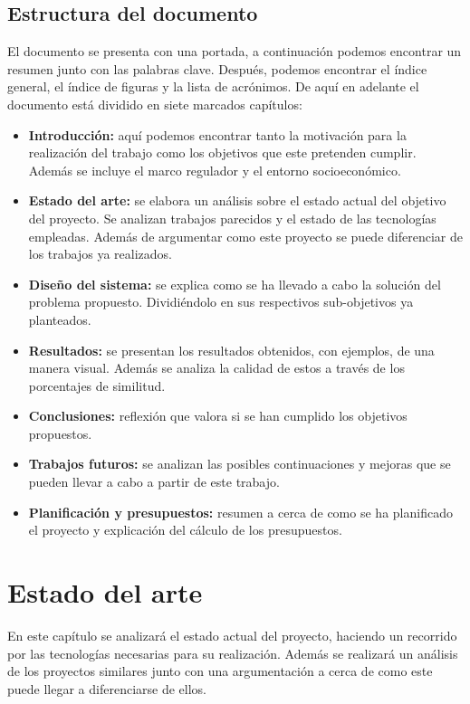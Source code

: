 \documentclass[12pt]{report} %
\begin{document}
	\section{Estructura del documento}
	El documento se presenta con una portada, a continuación podemos encontrar un resumen junto con las palabras clave. Después, podemos
	encontrar el índice general, el índice de figuras y la lista de acrónimos. De aquí en adelante el documento
	está dividido en siete marcados capítulos:
	\begin{itemize}
		\item \textbf{Introducción:} aquí podemos encontrar tanto la motivación para la realización del trabajo como los objetivos que este pretenden cumplir. Además se incluye el marco regulador y el entorno socioeconómico. 
		\item \textbf{Estado del arte:} se elabora un análisis sobre el estado actual del objetivo del proyecto. Se analizan trabajos parecidos y el estado de las tecnologías empleadas. Además de argumentar como este proyecto se puede diferenciar de los trabajos ya realizados.
		\item \textbf{Diseño del sistema:} se explica como se ha llevado a cabo la solución del problema propuesto. Dividiéndolo en sus respectivos sub-objetivos ya planteados.
		\item \textbf{Resultados:} se presentan los resultados obtenidos, con ejemplos, de una manera visual. Además se analiza la calidad de estos a través de los porcentajes de similitud.
		\item \textbf{Conclusiones:} reflexión que valora si se han cumplido los objetivos propuestos.
		\item \textbf{Trabajos futuros:} se analizan las posibles continuaciones y mejoras que se pueden llevar a cabo a partir de este trabajo.
		\item \textbf{Planificación y presupuestos:} resumen a cerca de como se ha planificado el proyecto y explicación del cálculo de los presupuestos. 
	\end{itemize}


\chapter{Estado del arte}
	En este capítulo se analizará el estado actual del proyecto, haciendo un recorrido por las tecnologías necesarias para su realización.
	Además se realizará un análisis de los proyectos similares junto con una argumentación a cerca de como este puede llegar a diferenciarse de ellos.
\end{document}
